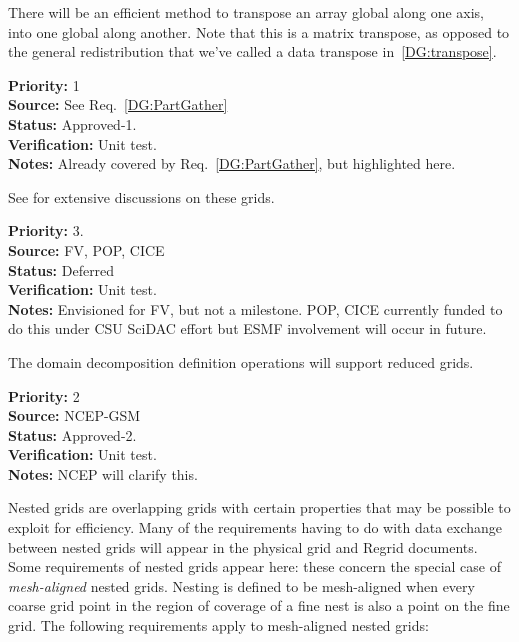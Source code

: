 There will be an efficient method to transpose an array global along
one axis, into one global along another. Note that this is a matrix
transpose, as opposed to the general redistribution that we've called
a data transpose in~\ref{DG:transpose}.

\begin{reqlist}
{\bf Priority:} 1 \\
{\bf Source:} See Req.~\ref{DG:PartGather}\\
{\bf Status:} Approved-1. \\
{\bf Verification:} Unit test. \\
{\bf Notes:} Already covered by Req.~\ref{DG:PartGather}, but
  highlighted here.
\end{reqlist}


See \cite{art:heikes+:geodesic,art:majewski+:gme} for extensive
discussions on these grids.

\begin{reqlist}
{\bf Priority:} 3. \\ 
{\bf Source:} FV, POP, CICE \\
{\bf Status:} Deferred \\
{\bf Verification:} Unit test. \\
{\bf Notes:} Envisioned for FV, but not a milestone.  POP, CICE
             currently funded to do this under CSU SciDAC effort
             but ESMF involvement will occur in future.
\end{reqlist}


The domain decomposition definition operations will support reduced
grids.

\begin{reqlist}
{\bf Priority:} 2 \\
{\bf Source:} NCEP-GSM \\
{\bf Status:} Approved-2. \\
{\bf Verification:} Unit test. \\
{\bf Notes:} NCEP will clarify this.
\end{reqlist}


Nested grids are overlapping grids with certain properties that may be
possible to exploit for efficiency. Many of the requirements having to
do with data exchange between nested grids will appear in the physical grid
and Regrid documents. Some requirements of nested grids appear here:
these concern the special case of \emph{mesh-aligned} nested
grids. Nesting is defined to be mesh-aligned when every coarse grid
point in the region of coverage of a fine nest is also a point on the
fine grid. The following requirements apply to mesh-aligned nested
grids:


